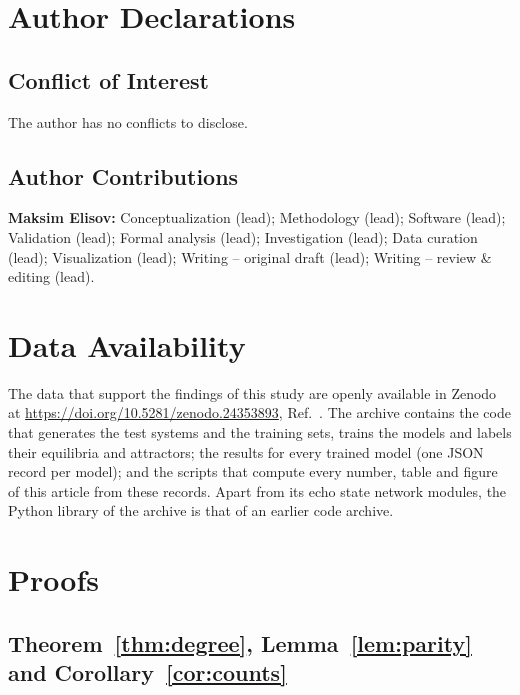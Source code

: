 \documentclass[aip,cha,reprint,amsmath,amssymb,longbibliography]{revtex4-2}
\theoremstyle{definition}
\begin{document}
\section*{Author Declarations}

\subsection*{Conflict of Interest}
The author has no conflicts to disclose.

\subsection*{Author Contributions}
\textbf{Maksim Elisov:} Conceptualization (lead); Methodology (lead); Software (lead); Validation (lead); Formal analysis (lead); Investigation (lead); Data curation (lead); Visualization (lead); Writing -- original draft (lead); Writing -- review \& editing (lead).

\section*{Data Availability}
The data that support the findings of this study are openly available in Zenodo at
\url{https://doi.org/10.5281/zenodo.24353893}, Ref.~. The archive contains the code that
generates the test systems and the training sets, trains the models and labels their equilibria and attractors; the results
for every trained model (one JSON record per model); and the scripts that compute every number, table and figure of this
article from these records. Apart from its echo state network modules, the Python library of the archive is that of an
earlier code archive.\cite{Elisov2026Code}

\appendix

\section{Proofs}
\label{app:proofs}

\subsection{Theorem~\ref{thm:degree}, Lemma~\ref{lem:parity} and Corollary~\ref{cor:counts}}
\end{document}
